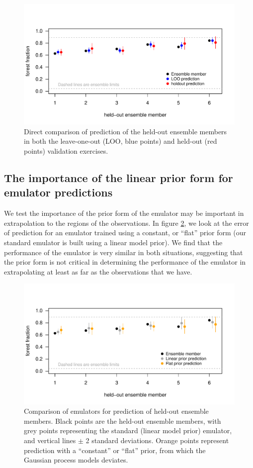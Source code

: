 \documentclass[gmd, manuscript]{copernicus} %
\begin{document}
\begin{figure}[t]
\includegraphics[width=12cm]{../graphics/loo_v_holdout1_prediction_error.pdf}
\caption{Direct comparison of prediction of the held-out ensemble members in both the leave-one-out (LOO, blue points) and held-out (red points) validation exercises.}
\label{fig:loo_v_holdout1_prediction_error}
\end{figure}


\subsection{The importance of the linear prior form for emulator predictions}
We test the importance of the prior form of the emulator may be important in extrapolation to the regions of the observations. In figure \ref{fig:loo_v_holdout_flat_prediction_error}, we look at the error of prediction for an emulator trained using a constant, or “flat” prior form (our standard emulator is built using a linear model prior). We find that the performance of the emulator is very similar in both situations, suggesting that the prior form is not critical in determining the performance of the emulator in extrapolating at least as far as the observations that we have.


\begin{figure}[t]
\includegraphics[width=12cm]{../graphics/loo_v_holdout_flat_prediction_error.pdf}
\caption{Comparison of emulators for prediction of held-out ensemble members. Black points are the held-out ensemble members, with grey points representing the standard (linear model prior) emulator, and vertical lines $\pm$ 2 standard deviations. Orange points represent prediction with a ``constant'' or ``flat'' prior, from which the Gaussian process models deviates.}
\label{fig:loo_v_holdout_flat_prediction_error}
\end{figure}
\end{document}
